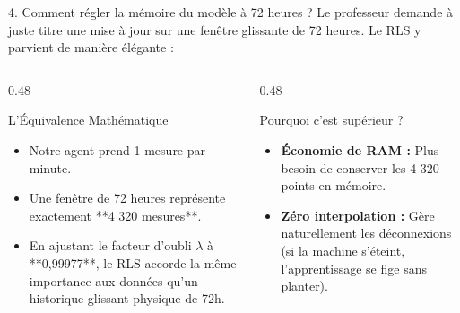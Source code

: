 \documentclass[10pt,aspectratio=169]{beamer}
\begin{document}
\begin{frame}{4. Comment régler la mémoire du modèle à 72 heures ?}
  Le professeur demande à juste titre une mise à jour sur une fenêtre glissante de 72 heures. Le RLS y parvient de manière élégante :
  
  \vspace{0.5em}
  \begin{columns}[T]
    \begin{column}{0.48\textwidth}
      \begin{block}{L'Équivalence Mathématique}
        \begin{itemize}
          \item Notre agent prend 1 mesure par minute.
          \item Une fenêtre de 72 heures représente exactement **4 320 mesures**.
          \item En ajustant le facteur d'oubli $\lambda$ à **0,99977**, le RLS accorde la même importance aux données qu'un historique glissant physique de 72h.
        \end{itemize}
      \end{block}
    \end{column}
    
    \begin{column}{0.48\textwidth}
      \begin{exampleblock}{Pourquoi c'est supérieur ?}
        \begin{itemize}
          \item \textbf{Économie de RAM :} Plus besoin de conserver les 4 320 points en mémoire.
          \item \textbf{Zéro interpolation :} Gère naturellement les déconnexions (si la machine s'éteint, l'apprentissage se fige sans planter).
        \end{itemize}
      \end{exampleblock}
    \end{column}
  \end{columns}
\end{frame}
\end{document}
